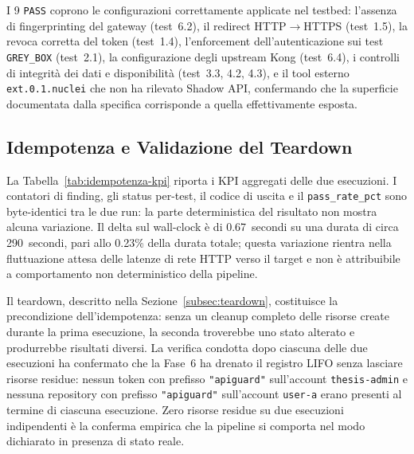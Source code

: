 I 9 \texttt{PASS} coprono le configurazioni correttamente applicate nel testbed: l'assenza di fingerprinting del gateway (test~6.2), il redirect \gls{HTTP}$\to$\gls{HTTPS} (test~1.5), la revoca corretta del token (test~1.4), l'enforcement dell'autenticazione sui test \texttt{GREY\_BOX} (test~2.1), la configurazione degli upstream Kong (test~6.4), i controlli di integrità dei dati e disponibilità (test~3.3, 4.2, 4.3), e il tool esterno \texttt{ext.0.1.nuclei} che non ha rilevato Shadow \gls{API}, confermando che la superficie documentata dalla specifica corrisponde a quella effettivamente esposta.


\subsection{Idempotenza e Validazione del Teardown}\label{subsec:idempotenza-teardown}

La Tabella~\ref{tab:idempotenza-kpi} riporta i \gls{KPI} aggregati delle due esecuzioni. I contatori di finding, gli status per-test, il codice di uscita e il \texttt{pass\_rate\_pct} sono byte-identici tra le due run: la parte deterministica del risultato non mostra alcuna variazione. Il delta sul wall-clock è di 0.67~secondi su una durata di circa 290~secondi, pari allo 0.23\% della durata totale; questa variazione rientra nella fluttuazione attesa delle latenze di rete \gls{HTTP} verso il target e non è attribuibile a comportamento non deterministico della pipeline.



Il teardown, descritto nella Sezione~\ref{subsec:teardown}, costituisce la precondizione dell'idempotenza: senza un cleanup completo delle risorse create durante la prima esecuzione, la seconda troverebbe uno stato alterato e produrrebbe risultati diversi. La verifica condotta dopo ciascuna delle due esecuzioni ha confermato che la Fase~6 ha drenato il registro \gls{LIFO} senza lasciare risorse residue: nessun token con prefisso \texttt{"apiguard"} sull'account \texttt{thesis-admin} e nessuna repository con prefisso \texttt{"apiguard"} sull'account \texttt{user-a} erano presenti al termine di ciascuna esecuzione. Zero risorse residue su due esecuzioni indipendenti è la conferma empirica che la pipeline si comporta nel modo dichiarato in presenza di stato reale.






